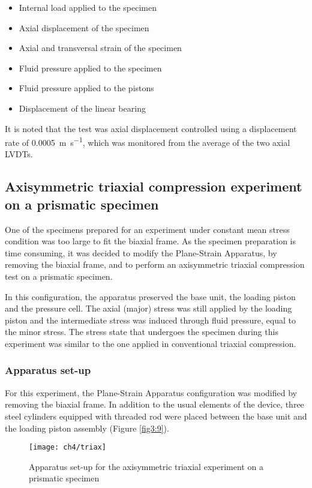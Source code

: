 \begin{itemize}
    \item Internal load applied to the specimen
    \item Axial displacement of the specimen
    \item Axial and transversal strain of the specimen
    \item Fluid pressure applied to the specimen
    \item Fluid pressure applied to the pistons
    \item Displacement of the linear bearing
\end{itemize}

It is noted that the test was axial displacement controlled using a displacement rate of \SI{0.0005}{\meter\per\second}, which was monitored from the average of the two axial LVDTs.

\subsection{Axisymmetric triaxial compression experiment on a prismatic specimen}

One of the specimens prepared for an experiment under constant mean stress condition was too large to fit the biaxial frame. As the specimen preparation is time consuming, it was decided to modify the Plane-Strain Apparatus, by removing the biaxial frame, and to perform an axisymmetric triaxial compression test on a prismatic specimen. 

In this configuration, the apparatus preserved the base unit, the loading piston and the pressure cell. The axial (major) stress was still applied by the loading piston and the intermediate stress was induced through fluid pressure, equal to the minor stress. The stress state that undergoes the specimen during this experiment was similar to the one applied in conventional triaxial compression. 

\subsubsection{Apparatus set-up}

For this experiment, the Plane-Strain Apparatus configuration was modified by removing the biaxial frame. In addition to the usual elements of the device, three steel cylinders equipped with threaded rod were placed between the base unit and the loading piston assembly (Figure \ref{fig3:9}). 

\begin{figure}[tb]
    \centering
    \texttt{[image: ch4/triax]}
    \caption{Apparatus set-up for the axisymmetric triaxial experiment on a prismatic specimen}
    \label{fig4:9}
\end{figure} 

